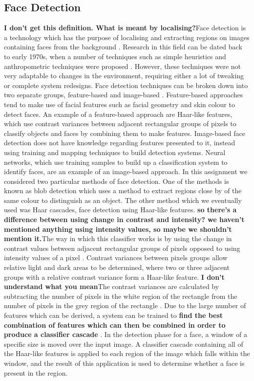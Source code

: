 \documentclass[conference]{IEEEtran}
\begin{document}
\subsection{Face Detection}
\textbf{I don't get this definition. What is meant by localising?}Face detection is a technology which has the purpose of localising and extracting regions on images containing faces from the background \cite{hjelmaas2001face}. Research in this field can be dated back to early 1970s, when a number of techniques such as simple heuristics and anthropometric techniques were proposed \cite{hjelmaas2001face}. However, these techniques were not very adaptable to changes in the environment, requiring either a lot of tweaking or complete system redesigns. Face detection techniques can be broken down into two separate groups, feature-based and image-based \cite{hjelmaas2001face}. Feature-based approaches tend to make use of facial features such as facial geometry and skin colour to detect faces. An example of a feature-based approach are Haar-like features, which use contrast variances between adjacent rectangular groups of pixels to classify objects and faces by combining them to make features. Image-based face detection does not have knowledge regarding features presented to it, instead using training and mapping techniques to build detection systems. Neural networks, which use training samples to build up a classification system to identify faces, are an example of an image-based approach. In this assignment we considered two particular methods of face detection. One of the methods is known as blob detection which uses a method to extract regions close by of the same colour to distinguish as an object. The other method which we eventually used was Haar cascades, face detection using Haar-like features. \textbf{so there's a difference between using change in contrast and intensity? we haven't mentioned anything using intensity values, so maybe we shouldn't mention it.}The way in which this classifier works is by using the change in contrast values between adjacent rectangular groups of pixels opposed to using intensity values of a pixel \cite{wilson2006facial}. Contrast variances between pixels groups allow relative light and dark areas to be determined, where two or three adjacent groups with a relative contrast variance form a Haar-like feature. \textbf{I don't understand what you mean}The contrast variances are calculated by subtracting the number of pixels in the white region of the rectangle from the number of pixels in the grey region of the rectangle \cite{viola2004robust}. Due to the large number of features which can be derived, a system can be trained to \textbf{find the best combination of features which can then be combined in order to produce a classifier cascade} \cite{viola2004robust}. In the detection phase for a face, a window of a specific size is moved over the input image. A classifier cascade containing all of the Haar-like features is applied to each region of the image which falls within the window, and the result of this application is used to determine whether a face is present in the region.
\end{document}
